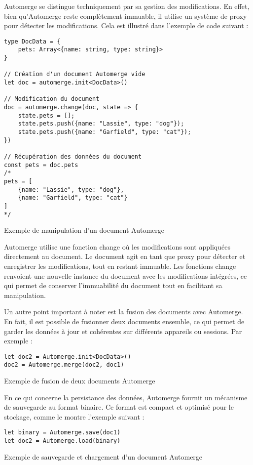 Automerge se distingue techniquement par sa gestion des modifications. En effet, bien qu'Automerge reste complètement immuable, il utilise un système de proxy pour détecter les modifications. Cela est illustré dans l'exemple de code suivant :

\begin{listing}[H]
    \begin{verbatim}
type DocData = {
    pets: Array<{name: string, type: string}>
}

// Création d'un document Automerge vide
let doc = automerge.init<DocData>()

// Modification du document
doc = automerge.change(doc, state => {
    state.pets = [];
    state.pets.push({name: "Lassie", type: "dog"});
    state.pets.push({name: "Garfield", type: "cat"});
})

// Récupération des données du document
const pets = doc.pets
/*
pets = [
    {name: "Lassie", type: "dog"},
    {name: "Garfield", type: "cat"}
]
*/
\end{verbatim}
    \caption{Exemple de manipulation d'un document Automerge}
\end{listing}

Automerge utilise une fonction change où les modifications sont appliquées directement au document. Le document agit en tant que proxy pour détecter et enregistrer les modifications, tout en restant immuable. Les fonctions change renvoient une nouvelle instance du document avec les modifications intégrées, ce qui permet de conserver l'immuabilité du document tout en facilitant sa manipulation.

Un autre point important à noter est la fusion des documents avec Automerge. En fait, il est possible de fusionner deux documents ensemble, ce qui permet de garder les données à jour et cohérentes sur différents appareils ou sessions. Par exemple :

\begin{listing}[H]
    \begin{verbatim}
let doc2 = Automerge.init<DocData>()
doc2 = Automerge.merge(doc2, doc1)
  \end{verbatim}
    \caption{Exemple de fusion de deux documents Automerge}
\end{listing}

En ce qui concerne la persistance des données, Automerge fournit un mécanisme de sauvegarde au format binaire\cite{BinaryDocumentFormat}. Ce format est compact et optimisé pour le stockage, comme le montre l'exemple suivant :
\begin{listing}[H]
    \begin{verbatim}
let binary = Automerge.save(doc1)
let doc2 = Automerge.load(binary)
  \end{verbatim}
    \caption{Exemple de sauvegarde et chargement d'un document Automerge}
\end{listing}


